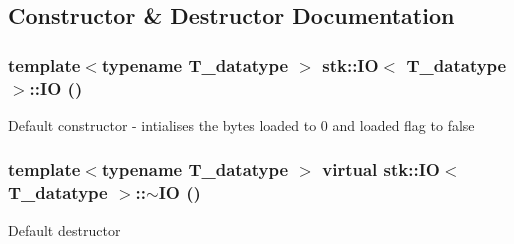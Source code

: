 \subsection{Constructor \& Destructor Documentation}
\hypertarget{classstk_1_1IO_a7bf75895372d604dd9251792cd3dc74f}{
\subsubsection[{IO}]{\setlength{\rightskip}{0pt plus 5cm}template$<$typename T\_\-datatype $>$ {\bf stk::IO}$<$ T\_\-datatype $>$::{\bf IO} ()}}
\label{classstk_1_1IO_a7bf75895372d604dd9251792cd3dc74f}
Default constructor -\/ intialises the bytes loaded to 0 and loaded flag to false \hypertarget{classstk_1_1IO_a8dad66d04b2367632b64c7f030e5ec2f}{
\subsubsection[{$\sim$IO}]{\setlength{\rightskip}{0pt plus 5cm}template$<$typename T\_\-datatype $>$ virtual {\bf stk::IO}$<$ T\_\-datatype $>$::$\sim${\bf IO} ()}}
\label{classstk_1_1IO_a8dad66d04b2367632b64c7f030e5ec2f}
Default destructor 

